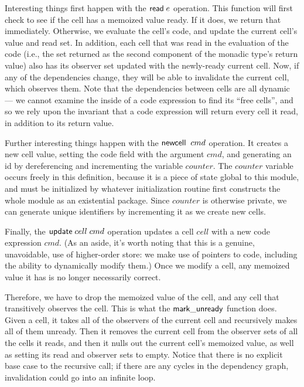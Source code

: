 Interesting things first happen with the $\mathsf{read}\; e$ operation. This
function will first check to see if the cell has a memoized value
ready. If it does, we return that immediately. Otherwise, we evaluate
the cell's code, and update the current cell's value and read set. In
addition, each cell that was read in the evaluation of the code (i.e.,
the set returned as the second component of the monadic type's return
value) also has its observer set updated with the newly-ready current
cell. Now, if any of the dependencies change, they will be able to
invalidate the current cell, which observes them. Note that the
dependencies between cells are all dynamic --- we cannot examine the
inside of a code expression to find its ``free cells'', and so we rely
upon the invariant that a code expression will return every cell it
read, in addition to its return value.

Further interesting things happen with the $\mathsf{newcell}\;\;cmd$
operation.  It creates a new cell value, setting the code field with
the argument $cmd$, and generating an id by dereferencing and
incrementing the variable $counter$. The $counter$ variable occurs
freely in this definition, because it is a piece of state global to
this module, and must be initialized by whatever initialization
routine first constructs the whole module as an existential package.
Since $counter$ is otherwise private, we can generate unique
identifiers by incrementing it as we create new cells. 

Finally, the $\mathsf{update}\;cell\;cmd$ operation updates a cell
$cell$ with a new code expression $cmd$. (As an aside, it's worth
noting that this is a genuine, unavoidable, use of higher-order store:
we make use of pointers to code, including the ability to dynamically
modify them.) Once we modify a cell, any memoized value it has is no
longer necessarily correct.

Therefore, we have to drop the memoized value of the cell, and any
cell that transitively observes the cell. This is what the
$\mathsf{mark\_unready}$ function does. Given a cell, it takes all of the
observers of the current cell and recursively makes all of
them unready. Then it removes the current cell from the observer sets of
all the cells it reads, and then it nulls out the current cell's
memoized value, as well as setting its read and observer sets to
empty. Notice that there is no explicit base case to the recursive
call; if there are any cycles in the dependency graph, invalidation
could go into an infinite loop. 

